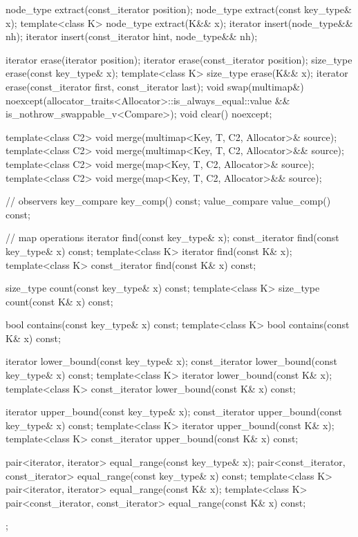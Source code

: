 \documentclass{wg21}
\begin{document}
\begin{codeblock}
{{    node_type extract(const_iterator position);
    node_type extract(const key_type& x);
    template<class K> node_type extract(K&& x);
    iterator insert(node_type&& nh);
    iterator insert(const_iterator hint, node_type&& nh);
    
    iterator  erase(iterator position);
    iterator  erase(const_iterator position);
    size_type erase(const key_type& x);
    template<class K> size_type erase(K&& x);
    iterator  erase(const_iterator first, const_iterator last);
    void      swap(multimap&)
    noexcept(allocator_traits<Allocator>::is_always_equal::value &&
    is_nothrow_swappable_v<Compare>);
    void      clear() noexcept;
    
    template<class C2>
    void merge(multimap<Key, T, C2, Allocator>& source);
    template<class C2>
    void merge(multimap<Key, T, C2, Allocator>&& source);
    template<class C2>
    void merge(map<Key, T, C2, Allocator>& source);
    template<class C2>
    void merge(map<Key, T, C2, Allocator>&& source);
    
    // observers
    key_compare key_comp() const;
    value_compare value_comp() const;
    
    // map operations
    iterator       find(const key_type& x);
    const_iterator find(const key_type& x) const;
    template<class K> iterator       find(const K& x);
    template<class K> const_iterator find(const K& x) const;
    
    size_type      count(const key_type& x) const;
    template<class K> size_type count(const K& x) const;
    
    bool           contains(const key_type& x) const;
    template<class K> bool contains(const K& x) const;
    
    iterator       lower_bound(const key_type& x);
    const_iterator lower_bound(const key_type& x) const;
    template<class K> iterator       lower_bound(const K& x);
    template<class K> const_iterator lower_bound(const K& x) const;
    
    iterator       upper_bound(const key_type& x);
    const_iterator upper_bound(const key_type& x) const;
    template<class K> iterator       upper_bound(const K& x);
    template<class K> const_iterator upper_bound(const K& x) const;
    
    pair<iterator, iterator>               equal_range(const key_type& x);
    pair<const_iterator, const_iterator>   equal_range(const key_type& x) const;
    template<class K>
    pair<iterator, iterator>             equal_range(const K& x);
    template<class K>
    pair<const_iterator, const_iterator> equal_range(const K& x) const;
};

}
\end{codeblock}
\end{document}
